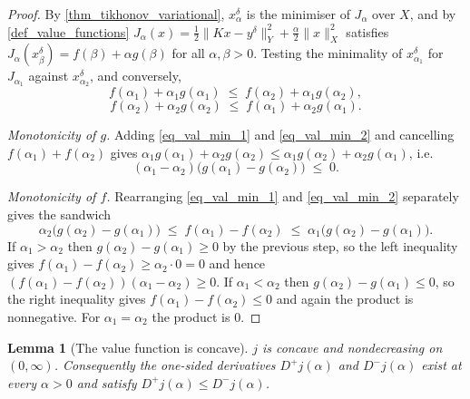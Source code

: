 \documentclass[a4paper]{report}
\theoremstyle{plain}
\newtheorem{lemma}[theorem]{Lemma}
\theoremstyle{definition}
\theoremstyle{remark}
\begin{document}
\begin{proof}
  By \cref{thm_tikhonov_variational}, $x^{\delta}_{\alpha}$ is the minimiser of
  $J_{\alpha}$ over $X$, and by \cref{def_value_functions} $J_{\alpha}(x) =
  \tfrac12\|Kx-y^{\delta}\|_Y^{2} + \tfrac{\alpha}{2}\|x\|_X^{2}$ satisfies
  $J_{\alpha}(x^{\delta}_{\beta}) = f(\beta) + \alpha g(\beta)$ for all $\alpha,\beta>0$.
  Testing the minimality of $x^{\delta}_{\alpha_1}$ for $J_{\alpha_1}$ against
  $x^{\delta}_{\alpha_2}$, and conversely,
  \begin{equation}\label{eq_val_min_1}
    f(\alpha_1) + \alpha_1 g(\alpha_1) \;\le\; f(\alpha_2) + \alpha_1 g(\alpha_2),
  \end{equation}
  \begin{equation}\label{eq_val_min_2}
    f(\alpha_2) + \alpha_2 g(\alpha_2) \;\le\; f(\alpha_1) + \alpha_2 g(\alpha_1).
  \end{equation}

  \emph{Monotonicity of $g$.}  Adding \eqref{eq_val_min_1} and \eqref{eq_val_min_2} and
  cancelling $f(\alpha_1) + f(\alpha_2)$ gives $\alpha_1 g(\alpha_1) + \alpha_2
  g(\alpha_2) \le \alpha_1 g(\alpha_2) + \alpha_2 g(\alpha_1)$, i.e.\
  \[
    (\alpha_1 - \alpha_2)\bigl(g(\alpha_1) - g(\alpha_2)\bigr) \;\le\; 0 .
  \]

  \emph{Monotonicity of $f$.}  Rearranging \eqref{eq_val_min_1} and
  \eqref{eq_val_min_2} separately gives the sandwich
  \[
    \alpha_2\bigl(g(\alpha_2) - g(\alpha_1)\bigr) \;\le\; f(\alpha_1) - f(\alpha_2)
      \;\le\; \alpha_1\bigl(g(\alpha_2) - g(\alpha_1)\bigr) .
  \]
  If $\alpha_1 > \alpha_2$ then $g(\alpha_2) - g(\alpha_1) \ge 0$ by the previous step,
  so the left inequality gives $f(\alpha_1) - f(\alpha_2) \ge \alpha_2 \cdot 0 = 0$ and
  hence $(f(\alpha_1)-f(\alpha_2))(\alpha_1-\alpha_2) \ge 0$.  If $\alpha_1 < \alpha_2$
  then $g(\alpha_2) - g(\alpha_1) \le 0$, so the right inequality gives $f(\alpha_1) -
  f(\alpha_2) \le 0$ and again the product is nonnegative.  For $\alpha_1 = \alpha_2$ the
  product is $0$.
\end{proof}


\begin{lemma}[The value function is concave]
  \label{lem_value_concave}
  $j$ is concave and nondecreasing on $(0,\infty)$.  Consequently the one-sided
  derivatives $D^{+}j(\alpha)$ and $D^{-}j(\alpha)$ exist at every $\alpha > 0$ and
  satisfy $D^{+}j(\alpha) \le D^{-}j(\alpha)$.
\end{lemma}
\end{document}
